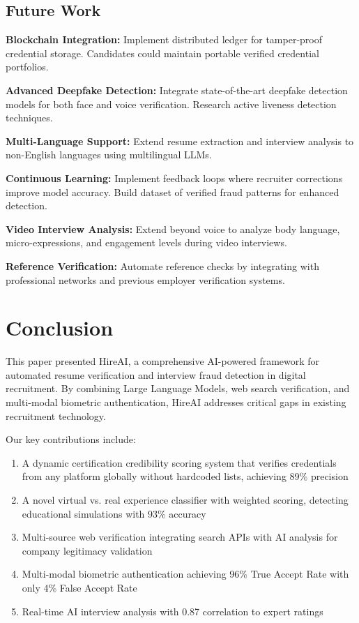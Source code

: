 \documentclass[journal]{IEEEtran}
\begin{document}
\subsection{Future Work}

\textbf{Blockchain Integration:} Implement distributed ledger for tamper-proof credential storage. Candidates could maintain portable verified credential portfolios.

\textbf{Advanced Deepfake Detection:} Integrate state-of-the-art deepfake detection models for both face and voice verification. Research active liveness detection techniques.

\textbf{Multi-Language Support:} Extend resume extraction and interview analysis to non-English languages using multilingual LLMs.

\textbf{Continuous Learning:} Implement feedback loops where recruiter corrections improve model accuracy. Build dataset of verified fraud patterns for enhanced detection.

\textbf{Video Interview Analysis:} Extend beyond voice to analyze body language, micro-expressions, and engagement levels during video interviews.

\textbf{Reference Verification:} Automate reference checks by integrating with professional networks and previous employer verification systems.

\section{Conclusion}

This paper presented HireAI, a comprehensive AI-powered framework for automated resume verification and interview fraud detection in digital recruitment. By combining Large Language Models, web search verification, and multi-modal biometric authentication, HireAI addresses critical gaps in existing recruitment technology.

Our key contributions include:
\begin{enumerate}
\item A dynamic certification credibility scoring system that verifies credentials from any platform globally without hardcoded lists, achieving 89\% precision
\item A novel virtual vs. real experience classifier with weighted scoring, detecting educational simulations with 93\% accuracy
\item Multi-source web verification integrating search APIs with AI analysis for company legitimacy validation
\item Multi-modal biometric authentication achieving 96\% True Accept Rate with only 4\% False Accept Rate
\item Real-time AI interview analysis with 0.87 correlation to expert ratings
\end{enumerate}
\end{document}
